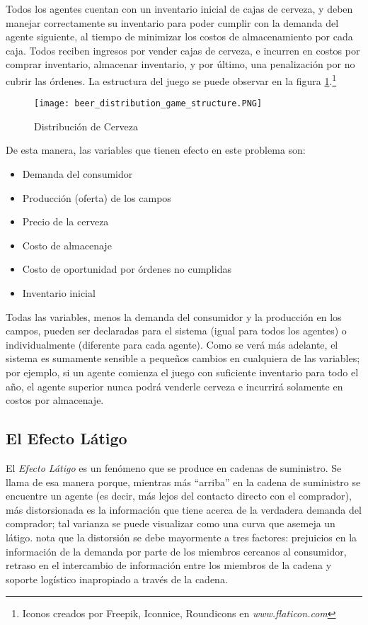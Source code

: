 Todos los agentes cuentan con un inventario inicial de cajas de cerveza, y deben manejar correctamente su inventario para poder cumplir con la demanda del agente siguiente, al tiempo de minimizar los costos de almacenamiento por cada caja. Todos reciben ingresos por vender cajas de cerveza, e incurren en costos por comprar inventario, almacenar inventario, y por \'ultimo, una penalizaci\'on por no cubrir las \'ordenes. La estructura del juego se puede observar en la figura \ref{structure}.\footnote{Iconos creados por Freepik, Iconnice, Roundicons en \textit{www.flaticon.com}}\\


\begin{figure}[ht]
\caption{Distribuci\'on de Cerveza}
\label{structure}
\texttt{[image: beer\_distribution\_game\_structure.PNG]}
\centering
\end{figure}

De esta manera, las variables que tienen efecto en este problema son:

\begin{itemize}
    \item Demanda del consumidor
    \item Producci\'on (oferta) de los campos
    \item Precio de la cerveza
    \item Costo de almacenaje
    \item Costo de oportunidad por \'ordenes no cumplidas
    \item Inventario inicial
\end{itemize}

Todas las variables, menos la demanda del consumidor y la producci\'on en los campos, pueden ser declaradas para el sistema (igual para todos los agentes) o individualmente (diferente para cada agente). Como se ver\'a m\'as adelante, el sistema es sumamente sensible a peque\~nos cambios en cualquiera de las variables; por ejemplo, si un agente comienza el juego con suficiente inventario para todo el a\~no, el agente superior nunca podr\'a venderle cerveza e incurrir\'a solamente en costos por almacenaje.

\subsection{El Efecto Látigo}

El \textit{Efecto Látigo} es un fen\'omeno que se produce en cadenas de suministro. Se llama de esa manera porque, mientras m\'as ``arriba'' en la cadena de suministro se encuentre un agente (es decir, m\'as lejos del contacto directo con el comprador), m\'as distorsionada es la informaci\'on que tiene acerca de la verdadera demanda del comprador; tal varianza se puede visualizar como una curva que asemeja un l\'atigo. \citet{Chaharsooghi} nota que la distorsi\'on se debe mayormente a tres factores: prejuicios en la informaci\'on de la demanda por parte de los miembros cercanos al consumidor, retraso en el intercambio de informaci\'on entre los miembros de la cadena y soporte log\'istico inapropiado a trav\'es de la cadena. \\

